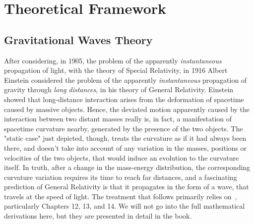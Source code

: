 \chapter{Theoretical Framework}


\section{Gravitational Waves Theory}
After considering, in 1905, the problem of the apparently \textit{instantaneous} propagation of light, with the theory of Special Relativity, in 1916 Albert Einstein considered the problem of the apparently \textit{instantaneous} propagation of gravity through \textit{long distances}, in his theory of General Relativity.
Einstein showed that long-distance interaction arises from the deformation of spacetime caused by massive objects.
Hence, the deviated motion apparently caused by the interaction between two distant masses really is, in fact, a manifestation of spacetime curvature nearby, generated by the presence of the two objects.
The "static case" just depicted, though, treats the curvature as if it had always been there, and doesn't take into account of any variation in the masses, positions or velocities of the two objects, that would induce an evolution to the curvature itself.
In truth, after a change in the mass-energy distribution, the corresponding curvature variation requires its time to reach far distances, and a fascinating prediction of General Relativity is that it propagates in the form of a wave, that travels at the speed of light.
The treatment that follows primarily relies on~\cite{ferrari2020general}, particularly Chapters 12, 13, and 14.
We will not go into the full mathematical derivations here, but they are presented in detail in the book.

